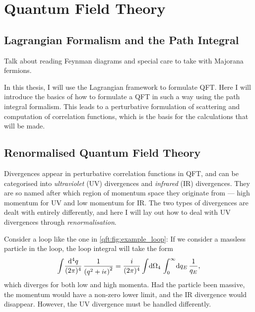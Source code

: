 \documentclass[../main.tex]{subfiles}
\begin{document}
\chapter{Quantum Field Theory}

\section{Lagrangian Formalism and the Path Integral}

\begin{TODO}
    \item Talk about reading Feynman diagrams and special care to take with
    Majorana fermions.
\end{TODO}

In this thesis, I will use the Lagrangian framework to formulate QFT. Here I
will introduce the basics of how to formulate a QFT in such a way using the
path integral formalism. This leads to a perturbative formulation of scattering
and computation of correlation functions, which is the basis for the
calculations that will be made. \medskip

\section{Renormalised Quantum Field Theory}


Divergences appear in perturbative correlation functions in QFT, and can be
categorised into \emph{ultraviolet} (UV) divergences and \emph{infrared} (IR)
divergences. They are so named after which region of momentum space they
originate from --- high momentum for UV and low momentum for IR. The two types
of divergences are dealt with entirely differently, and here I will lay out how
to deal with UV divergences through \emph{renormalisation}. \medskip

Consider a loop like the one in \cref{qft:fig:example_loop}: If we consider a
massless particle in the loop, the loop integral will take the form
\begin{equation}
    \label{qft:eq:example_loop}
    \loopintegral[4]{q} \frac{1}{\pclosed{q^2 + i\epsilon}^2} =
    \frac{i}{(2\pi)^4} \integral{\Omega_4} \integral[_0^\infty]{q_E}
    \frac{1}{q_E},
\end{equation}
which diverges for both low and high momenta.  Had the particle been
massive, the momentum would have a non-zero lower limit, and the IR divergence
would disappear.
However, the UV divergence must be handled differently.
\end{document}
